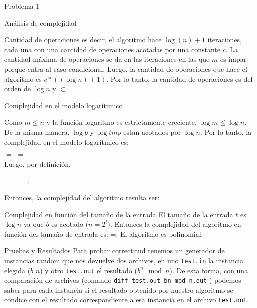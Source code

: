 \begin{section}{Problema 1}
\begin{subsection}{Análisis de complejidad}
\begin{subsubsection}{Cantidad de operaciones}
			\noindent es decir, el algoritmo hace $\log(n)+1$ iteraciones, cada una con una cantidad de operaciones acotadas por una constante $c$. La cantidad máxima de
			operaciones se da en las iteraciones en las que $m$ es impar porque entra al caso condicional. Luego, la cantidad de operaciones que hace el algoritmo es $c*((\log n)+1)$.
			Por lo tanto, la cantidad de operaciones es del orden de $\log n$ y  $\subset$ .

		\end{subsubsection}


		\begin{subsubsection}{Complejidad en el modelo logarítimico}

			Como $m\leq n$ y la función logaritmo es estrictamente creciente, $\log m \leq \log n$. De la misma manera, $\log b$ y $\log tmp$ están acotados por $\log n$. Por lo tanto, la complejidad en el modelo logarítmico es: \\
			 $=$ \\
			$=$  $=$  \\

			Luego, por definición, 
			\begin{center}
				 $=$  $=$ .
			\end{center}

			Entonces, la complejidad del algoritmo resulta ser: 
		
		\end{subsubsection}


		\begin{subsubsection}{Complejidad en función del tamaño de la entrada}
			El tamaño de la entrada $t$ es $\log n$ ya que $b$ es acotado ($n=2^t$). Entonces la complejidad del algoritmo en función del tamaño de entrada es: =. El algoritmo es polinomial.
		\end{subsubsection}

	\end{subsection}
	\begin{subsection}{Pruebas y Resultados}
		Para probar correctitud tenemos un generador de instancias random que nos devuelve dos archivos, en uno \texttt{test.in} la instancia elegida ($b$ $n$) y otro \texttt{test.out} el resultado ($b^n \mod n$). De esta forma, con una comparación de archivos (comando \texttt{diff test.out bn\_mod\_n.out} ) podemos saber para cada instancia si el resultado obtenido por nuestro algoritmo se condice con el resultado correspondiente a esa instancia en el archivo \texttt{test.out}.
		

\end{subsection}
\end{section}

